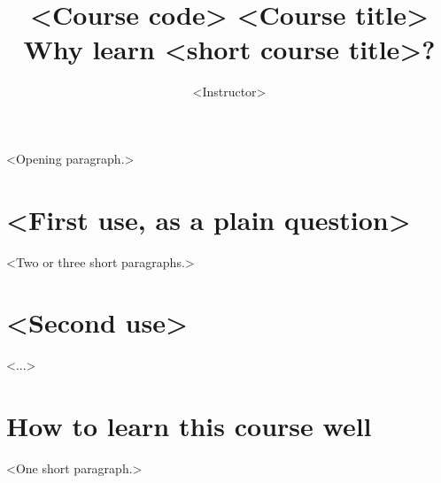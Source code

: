 \documentclass[11pt,a4paper]{article}
\title{\textbf{<Course code> <Course title>}\\[4pt]
\large Why learn <short course title>?}
\author{<Instructor>}
\date{}
\begin{document}
\maketitle

<Opening paragraph.>

\section*{<First use, as a plain question>}
<Two or three short paragraphs.>

\section*{<Second use>}
<...>


\section*{How to learn this course well}
<One short paragraph.>
\end{document}
